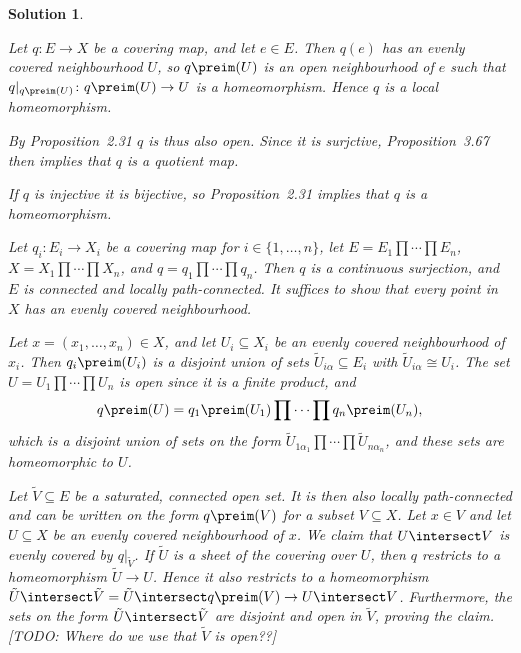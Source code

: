 \documentclass[article, a4paper, 11pt, oneside]{memoir}
\numberwithin{equation}{chapter}
\theoremstyle{nonumberplain}
\newtheorem{solution}{Solution}
\begin{document}
\begin{solution}
\begin{solutionsec}
    \item Let $q \colon E \to X$ be a covering map, and let $e \in E$. Then $q(e)$ has an evenly covered neighbourhood $U$, so $q\preim(U)$ is an open neighbourhood of $e$ such that $q|_{q\preim(U)} \colon q\preim(U) \to U$ is a homeomorphism. Hence $q$ is a local homeomorphism.

    By Proposition~2.31 $q$ is thus also open. Since it is surjctive, Proposition~3.67 then implies that $q$ is a quotient map.

    \item If $q$ is injective it is bijective, so Proposition~2.31 implies that $q$ is a homeomorphism.
    
    \item Let $q_i \colon E_i \to X_i$ be a covering map for $i \in \{1, \ldots, n\}$, let $E = E_1 \prod \cdots \prod E_n$, $X = X_1 \prod \cdots \prod X_n$, and $q = q_1 \prod \cdots \prod q_n$. Then $q$ is a continuous surjection, and $E$ is connected and locally path-connected. It suffices to show that every point in $X$ has an evenly covered neighbourhood.
    
    Let $x = (x_1, \ldots, x_n) \in X$, and let $U_i \subseteq X_i$ be an evenly covered neighbourhood of $x_i$. Then $q_i\preim(U_i)$ is a disjoint union of sets $\tilde{U}_{i \alpha} \subseteq E_i$ with $\tilde{U}_{i \alpha} \cong U_i$. The set $U = U_1 \prod \cdots \prod U_n$ is open since it is a finite product, and
    \begin{equation*}
        q\preim(U)
            = q_1\preim(U_1) \prod \cdots \prod q_n\preim(U_n),
    \end{equation*}
    which is a disjoint union of sets on the form $\tilde{U}_{1 \alpha_1} \prod \cdots \prod \tilde{U}_{n \alpha_n}$, and these sets are homeomorphic to $U$.

    \item Let $\tilde{V} \subseteq E$ be a saturated, connected open set. It is then also locally path-connected and can be written on the form $q\preim(V)$ for a subset $V \subseteq X$. Let $x \in V$ and let $U \subseteq X$ be an evenly covered neighbourhood of $x$. We claim that $U \intersect V$ is evenly covered by $q|_{\tilde{V}}$. If $\tilde{U}$ is a sheet of the covering over $U$, then $q$ restricts to a homeomorphism $\tilde{U} \to U$. Hence it also restricts to a homeomorphism $\tilde{U} \intersect \tilde{V} = \tilde{U} \intersect q\preim(V) \to U \intersect V$. Furthermore, the sets on the form $\tilde{U} \intersect \tilde{V}$ are disjoint and open in $\tilde{V}$, proving the claim. [TODO: Where do we use that $\tilde{V}$ is open??]
\end{solutionsec}
\end{solution}
\end{document}
